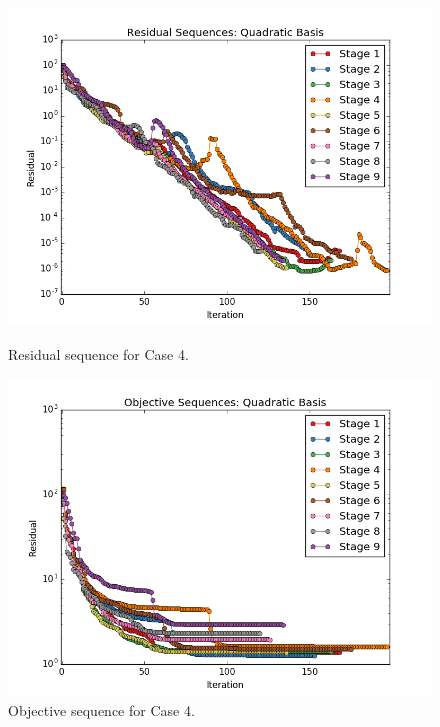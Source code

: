 \documentclass[]{aiaa-tc}%
\begin{document}
\begin{figure}[!ht]
\centering
\begin{minipage}{.50\textwidth}
 \centering
 \includegraphics[width=.8\textwidth]{../images/residual_case4}
 \caption{Residual sequence for Case 4.}
 \label{fig:residual_case4}
\end{minipage}%
\begin{minipage}{.50\textwidth}
 \centering
 \includegraphics[width=.8\textwidth]{../images/objective_case4}
 \caption{Objective sequence for Case 4.}
 \label{fig:objective_case4}
\end{minipage}
\end{figure}
\end{document}
